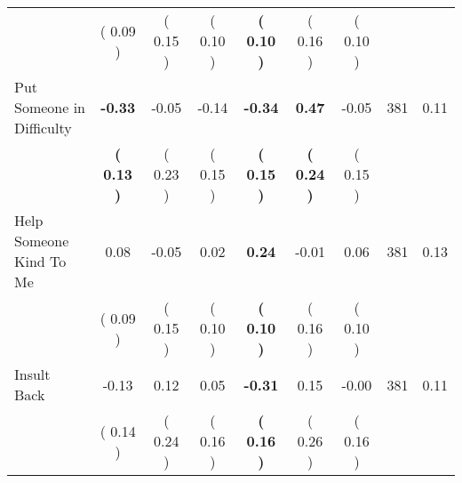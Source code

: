 \begin{tabular}{lcccccccc}
 & (     0.09 ) & (     0.15 ) & (     0.10 ) & \textbf{(     0.10 )} & (     0.16 ) & (     0.10 ) & \\
Put Someone in Difficulty & \textbf{    -0.33} &     -0.05 &     -0.14 & \textbf{    -0.34} & \textbf{     0.47} &     -0.05 & 381 &       0.11 \\ 
 & \textbf{(     0.13 )} & (     0.23 ) & (     0.15 ) & \textbf{(     0.15 )} & \textbf{(     0.24 )} & (     0.15 ) & \\
Help Someone Kind To Me &      0.08 &     -0.05 &      0.02 & \textbf{     0.24} &     -0.01 &      0.06 & 381 &       0.13 \\ 
 & (     0.09 ) & (     0.15 ) & (     0.10 ) & \textbf{(     0.10 )} & (     0.16 ) & (     0.10 ) & \\
Insult Back &     -0.13 &      0.12 &      0.05 & \textbf{    -0.31} &      0.15 &     -0.00 & 381 &       0.11 \\ 
 & (     0.14 ) & (     0.24 ) & (     0.16 ) & \textbf{(     0.16 )} & (     0.26 ) & (     0.16 ) & \\
\bottomrule
\end{tabular}
